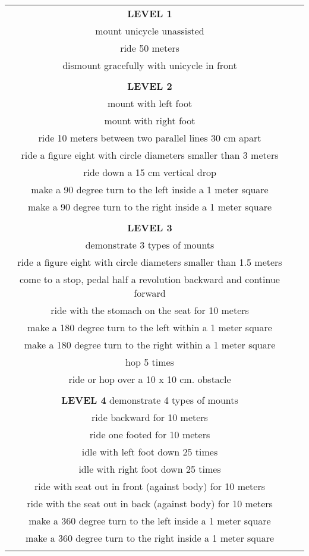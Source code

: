 \begin{tabular}{cc}
\textbf{LEVEL 1}\\
mount unicycle unassisted\\
ride 50 meters\\
dismount gracefully with unicycle in front\\\\
\textbf{LEVEL 2}\\
mount with left foot\\
mount with right foot\\
ride 10 meters between two parallel lines 30 cm apart\\
ride a figure eight with circle diameters smaller than 3 meters\\
ride down a 15 cm vertical drop\\
make a 90 degree turn to the left inside a 1 meter square\\
make a 90 degree turn to the right inside a 1 meter square\\\\
\textbf{LEVEL 3}\\
demonstrate 3 types of mounts\\
ride a figure eight with circle diameters smaller than 1.5 meters\\
come to a stop, pedal half a revolution backward and continue forward\\
ride with the stomach on the seat for 10 meters\\
make a 180 degree turn to the left within a 1 meter square\\
make a 180 degree turn to the right within a 1 meter square\\
hop 5 times\\
ride or hop over a 10 x 10 cm. obstacle\\\\
\textbf{LEVEL 4}
demonstrate 4 types of mounts\\
ride backward for 10 meters\\
ride one footed for 10 meters\\
idle with left foot down 25 times\\
idle with right foot down 25 times\\
ride with seat out in front (against body) for 10 meters\\
ride with the seat out in back (against body) for 10 meters\\
make a 360 degree turn to the left inside a 1 meter square\\
make a 360 degree turn to the right inside a 1 meter square\\\\

\end{tabular}

